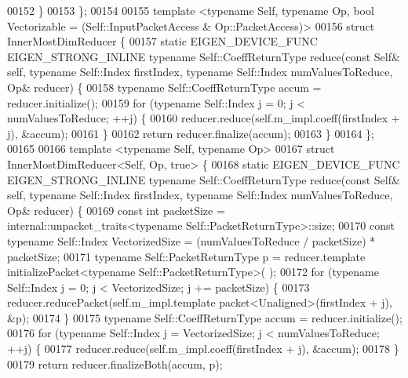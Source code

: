 \begin{DoxyCode}
00152   \}
00153 \};
00154 
00155 \textcolor{keyword}{template} <\textcolor{keyword}{typename} Self, \textcolor{keyword}{typename} Op, \textcolor{keywordtype}{bool} Vectorizable = (Self::InputPacketAccess & Op::PacketAccess)>
00156 \textcolor{keyword}{struct }InnerMostDimReducer \{
00157   \textcolor{keyword}{static} EIGEN\_DEVICE\_FUNC EIGEN\_STRONG\_INLINE \textcolor{keyword}{typename} Self::CoeffReturnType reduce(\textcolor{keyword}{const} Self& \textcolor{keyword}{self}, \textcolor{keyword}{
      typename} Self::Index firstIndex, \textcolor{keyword}{typename} Self::Index numValuesToReduce, Op& reducer) \{
00158     \textcolor{keyword}{typename} Self::CoeffReturnType accum = reducer.initialize();
00159     \textcolor{keywordflow}{for} (\textcolor{keyword}{typename} Self::Index j = 0; j < numValuesToReduce; ++j) \{
00160       reducer.reduce(\textcolor{keyword}{self}.m\_impl.coeff(firstIndex + j), &accum);
00161     \}
00162     \textcolor{keywordflow}{return} reducer.finalize(accum);
00163   \}
00164 \};
00165 
00166 \textcolor{keyword}{template} <\textcolor{keyword}{typename} Self, \textcolor{keyword}{typename} Op>
00167 \textcolor{keyword}{struct }InnerMostDimReducer<Self, Op, true> \{
00168   \textcolor{keyword}{static} EIGEN\_DEVICE\_FUNC EIGEN\_STRONG\_INLINE \textcolor{keyword}{typename} Self::CoeffReturnType reduce(\textcolor{keyword}{const} Self& \textcolor{keyword}{self}, \textcolor{keyword}{
      typename} Self::Index firstIndex, \textcolor{keyword}{typename} Self::Index numValuesToReduce, Op& reducer) \{
00169     \textcolor{keyword}{const} \textcolor{keywordtype}{int} packetSize = internal::unpacket\_traits<typename Self::PacketReturnType>::size;
00170     \textcolor{keyword}{const} \textcolor{keyword}{typename} Self::Index VectorizedSize = (numValuesToReduce / packetSize) * packetSize;
00171     \textcolor{keyword}{typename} Self::PacketReturnType p = reducer.template initializePacket<typename Self::PacketReturnType>(
      );
00172     \textcolor{keywordflow}{for} (\textcolor{keyword}{typename} Self::Index j = 0; j < VectorizedSize; j += packetSize) \{
00173       reducer.reducePacket(\textcolor{keyword}{self}.m\_impl.template packet<Unaligned>(firstIndex + j), &p);
00174     \}
00175     \textcolor{keyword}{typename} Self::CoeffReturnType accum = reducer.initialize();
00176     \textcolor{keywordflow}{for} (\textcolor{keyword}{typename} Self::Index j = VectorizedSize; j < numValuesToReduce; ++j) \{
00177       reducer.reduce(\textcolor{keyword}{self}.m\_impl.coeff(firstIndex + j), &accum);
00178     \}
00179     \textcolor{keywordflow}{return} reducer.finalizeBoth(accum, p);

\end{DoxyCode}
